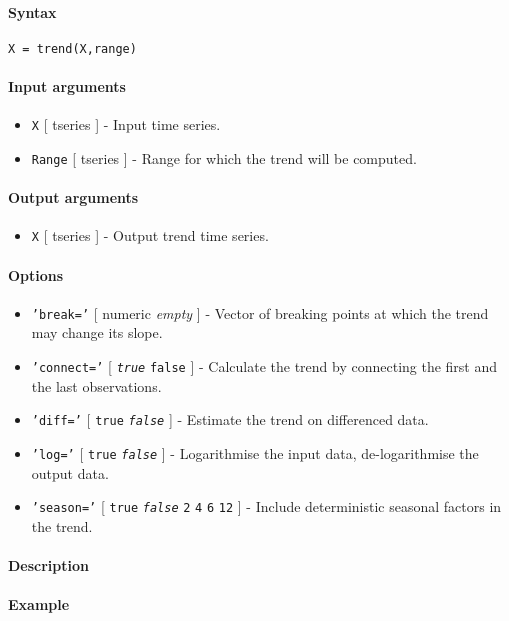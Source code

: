 


	\paragraph{Syntax}

\begin{verbatim}
X = trend(X,range)
\end{verbatim}

\paragraph{Input arguments}

\begin{itemize}
\item
  \texttt{X} {[} tseries {]} - Input time series.
\item
  \texttt{Range} {[} tseries {]} - Range for which the trend will be
  computed.
\end{itemize}

\paragraph{Output arguments}

\begin{itemize}
\itemsep1pt\parskip0pt
\item
  \texttt{X} {[} tseries {]} - Output trend time series.
\end{itemize}

\paragraph{Options}

\begin{itemize}
\item
  \texttt{'break='} {[} numeric \textbar{} \emph{empty} {]} - Vector of
  breaking points at which the trend may change its slope.
\item
  \texttt{'connect='} {[} \emph{\texttt{true}} \textbar{} \texttt{false}
  {]} - Calculate the trend by connecting the first and the last
  observations.
\item
  \texttt{'diff='} {[} \texttt{true} \textbar{} \emph{\texttt{false}}
  {]} - Estimate the trend on differenced data.
\item
  \texttt{'log='} {[} \texttt{true} \textbar{} \emph{\texttt{false}} {]}
  - Logarithmise the input data, de-logarithmise the output data.
\item
  \texttt{'season='} {[} \texttt{true} \textbar{} \emph{\texttt{false}}
  \textbar{} \texttt{2} \textbar{} \texttt{4} \textbar{} \texttt{6}
  \textbar{} \texttt{12} {]} - Include deterministic seasonal factors in
  the trend.
\end{itemize}

\paragraph{Description}

\paragraph{Example}


